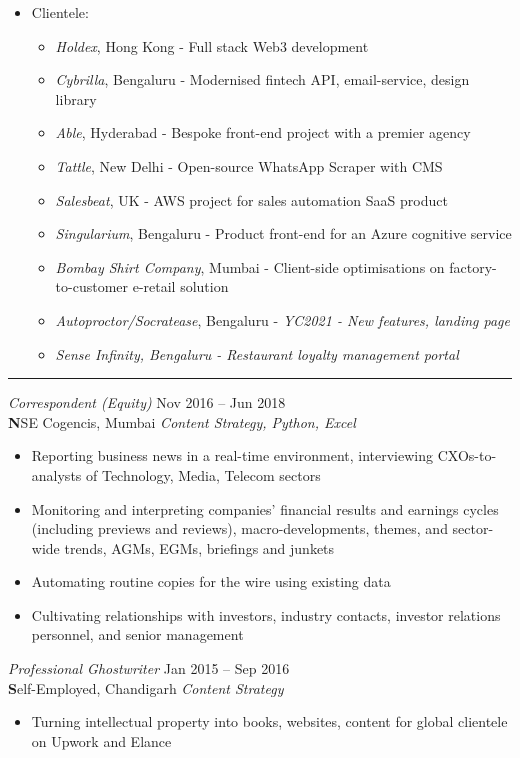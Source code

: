 \documentclass[margin, 10pt]{res} %
\begin{document}
\begin{resume}
\begin{itemize}
\item Clientele:
\begin{itemize}
\item {\sl Holdex}, Hong Kong - Full stack Web3 development
\item {\sl Cybrilla}, Bengaluru - Modernised fintech API, email-service, design library
\item {\sl Able}, Hyderabad - Bespoke front-end project with a premier agency
\item {\sl Tattle}, New Delhi - Open-source WhatsApp Scraper with CMS
\item {\sl Salesbeat}, UK - AWS project for sales automation SaaS product
\item {\sl Singularium}, Bengaluru - Product front-end for an Azure cognitive service
\item {\sl Bombay Shirt Company}, Mumbai - Client-side optimisations on factory-to-customer e-retail solution
\item {\sl Autoproctor/Socratease}, Bengaluru - \sl YC2021 - New features, landing page
\item {\sl Sense Infinity, Bengaluru - Restaurant loyalty management portal}
\end{itemize}
\end{itemize}
\par\noindent\rule{\textwidth}{0.1pt}

{\sl Correspondent (Equity)} \hfill Nov 2016 – Jun 2018 \\
\textbf NSE Cogencis, Mumbai \hfill {\scriptsize \it Content Strategy, Python, Excel}
\begin{itemize}\smallskip\smallskip
\item Reporting business news in a real-time environment, interviewing CXOs-to-analysts of Technology, Media, Telecom sectors
\item Monitoring and interpreting companies’ financial results and earnings cycles (including previews and reviews), macro-developments, themes, and sector-wide trends, AGMs, EGMs, briefings and junkets
\item Automating routine copies for the wire using existing data
\item Cultivating relationships with investors, industry contacts, investor relations personnel, and senior management

\end{itemize}

{\sl Professional Ghostwriter} \hfill Jan 2015 – Sep 2016 \\
\textbf Self-Employed, Chandigarh \hfill {\scriptsize \it Content Strategy}
\begin{itemize}\smallskip\smallskip
\item Turning intellectual property into books, websites, content for global clientele on Upwork and Elance
\end{itemize}


\end{resume}
\end{document}
